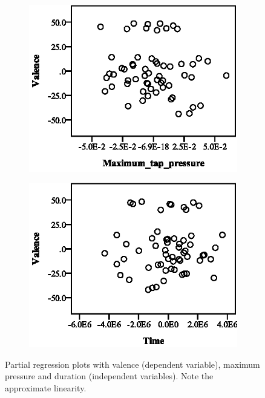 \begin{figure}[ht]
  \centering
  \begin{subfigure}[b]{0.45\textwidth}
    \centering
    \includegraphics[width=\textwidth]{images/linearity/partialregression/valence/ValMaxMax.eps}
    \label{fig:valmaxmax}
  \end{subfigure}
  \quad
  \begin{subfigure}[b]{0.45\textwidth}
    \centering
    \includegraphics[width=\textwidth]{images/linearity/partialregression/valence/ValMaxTime.eps}
    \label{fig:valmaxtime}
  \end{subfigure}
  \caption{Partial regression plots with valence (dependent variable), maximum pressure and duration (independent variables). Note the approximate linearity.}
\end{figure}

